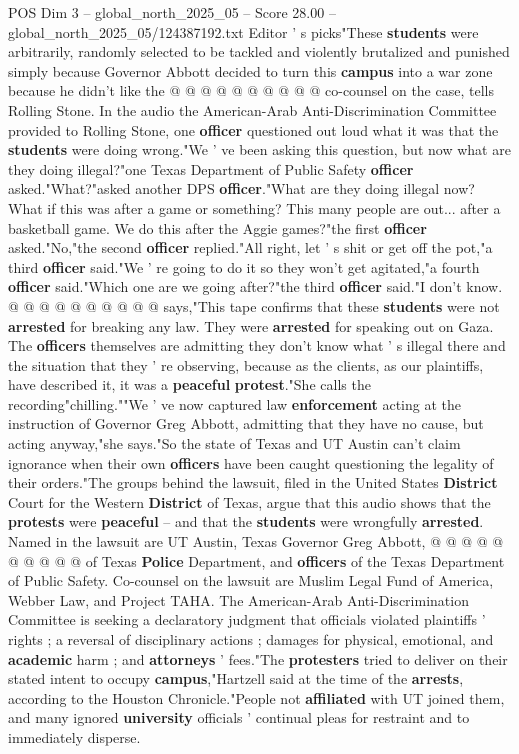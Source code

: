 \begin{textsample}{POS Dim 3 – global\_north\_2025\_05 – Score 28.00 – global\_north\_2025\_05/124387192.txt}
Editor ' s picks"These \textbf{students} were arbitrarily, randomly selected to be tackled and violently brutalized and punished simply because Governor Abbott decided to turn this \textbf{campus} into a war zone because he didn't like the @ @ @ @ @ @ @ @ @ @ co-counsel on the case, tells Rolling Stone.
In the audio the American-Arab Anti-Discrimination Committee provided to Rolling Stone, one \textbf{officer} questioned out loud what it was that the \textbf{students} were doing wrong."We ' ve been asking this question, but now what are they doing illegal?"one Texas Department of Public Safety \textbf{officer} asked."What?"asked another DPS \textbf{officer}."What are they doing illegal now?
What if this was after a game or something?
This many people are out... after a basketball game.
We do this after the Aggie games?"the first \textbf{officer} asked."No,"the second \textbf{officer} replied."All right, let ' s shit or get off the pot,"a third \textbf{officer} said."We ' re going to do it so they won't get agitated,"a fourth \textbf{officer} said."Which one are we going after?"the third \textbf{officer} said."I don't know. @ @ @ @ @ @ @ @ @ @ says,"This tape confirms that these \textbf{students} were not \textbf{arrested} for breaking any law.
They were \textbf{arrested} for speaking out on Gaza.
The \textbf{officers} themselves are admitting they don't know what ' s illegal there and the situation that they ' re observing, because as the clients, as our plaintiffs, have described it, it was a \textbf{peaceful} \textbf{protest}."She calls the recording"chilling.""We ' ve now captured law \textbf{enforcement} acting at the instruction of Governor Greg Abbott, admitting that they have no cause, but acting anyway,"she says."So the state of Texas and UT Austin can't claim ignorance when their own \textbf{officers} have been caught questioning the legality of their orders."The groups behind the lawsuit, filed in the United States \textbf{District} Court for the Western \textbf{District} of Texas, argue that this audio shows that the \textbf{protests} were \textbf{peaceful} -- and that the \textbf{students} were wrongfully \textbf{arrested}.
Named in the lawsuit are UT Austin, Texas Governor Greg Abbott, @ @ @ @ @ @ @ @ @ @ of Texas \textbf{Police} Department, and \textbf{officers} of the Texas Department of Public Safety.
Co-counsel on the lawsuit are Muslim Legal Fund of America, Webber Law, and Project TAHA.
The American-Arab Anti-Discrimination Committee is seeking a declaratory judgment that officials violated plaintiffs ' rights ; a reversal of disciplinary actions ; damages for physical, emotional, and \textbf{academic} harm ; and \textbf{attorneys} ' fees."The \textbf{protesters} tried to deliver on their stated intent to occupy \textbf{campus},"Hartzell said at the time of the \textbf{arrests}, according to the Houston Chronicle."People not \textbf{affiliated} with UT joined them, and many ignored \textbf{university} officials ' continual pleas for restraint and to immediately disperse.

\end{textsample}
